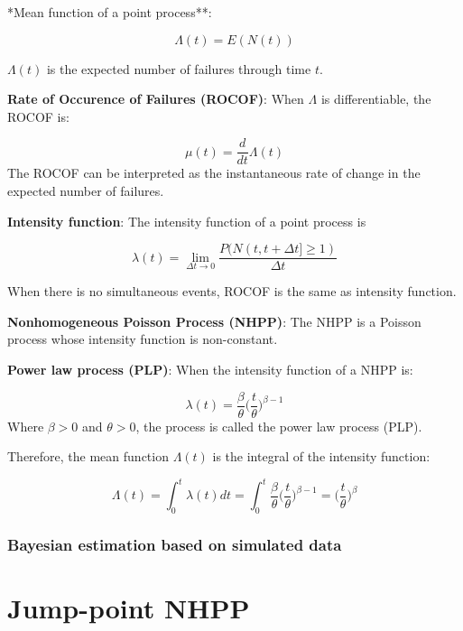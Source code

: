 \documentclass[12pt]{book}
\numberwithin{equation}{chapter}
\begin{document}
*Mean function of a point process**:

\[\Lambda(t) = E(N(t))\]

\(\Lambda(t)\) is the expected number of failures through time \(t\).

\textbf{Rate of Occurence of Failures (ROCOF)}: When \(\Lambda\) is differentiable, the ROCOF is:

\[\mu(t) = \frac{d}{dt}\Lambda(t)\]
The ROCOF can be interpreted as the instantaneous rate of change in the expected number of failures.

\textbf{Intensity function}: The intensity function of a point process is

\[\lambda(t) = \lim_{\Delta t \rightarrow 0}\frac{P(N(t, t+\Delta t] \geq 1)}{\Delta t}\]

When there is no simultaneous events, ROCOF is the same as intensity function.

\textbf{Nonhomogeneous Poisson Process (NHPP)}: The NHPP is a Poisson process whose intensity function is non-constant.

\textbf{Power law process (PLP)}: When the intensity function of a NHPP is:

\[\lambda(t) = \frac{\beta}{\theta}\bigg(\frac{t}{\theta}\bigg)^{\beta-1}\]
Where \(\beta > 0\) and \(\theta > 0\), the process is called the power law process (PLP).

Therefore, the mean function \(\Lambda(t)\) is the integral of the intensity function:

\[\Lambda(t) = \int_0^t \lambda(t)dt = \int_0^t \frac{\beta}{\theta}\bigg(\frac{t}{\theta}\bigg)^{\beta-1} = \bigg(\frac{t}{\theta}\bigg)^{\beta}\]

\hypertarget{section}{%
\subsection{}\label{section}}

\hypertarget{bayesian-estimation-based-on-simulated-data-1}{%
\subsection{Bayesian estimation based on simulated data}\label{bayesian-estimation-based-on-simulated-data-1}}

\hypertarget{jump-point-nhpp}{%
\chapter{Jump-point NHPP}\label{jump-point-nhpp}}
\end{document}
